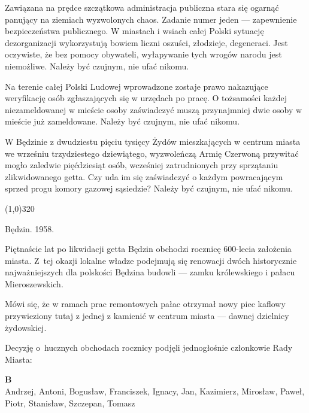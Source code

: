 \documentclass[11pt,a4paper,oneside]{article}
\begin{document}
Zawiązana na prędce szczątkowa administracja publiczna stara się
ogarnąć panujący na ziemiach wyzwolonych chaos. Zadanie numer jeden
--- zapewnienie bezpieczeństwa publicznego. W miastach i wsiach całej
Polski sytuację dezorganizacji wykorzystują bowiem liczni oszuści,
złodzieje, degeneraci. Jest oczywiste, że bez pomocy obywateli,
wyłapywanie tych wrogów narodu jest niemożliwe. Należy być czujnym,
nie ufać nikomu.

Na terenie całej Polski Ludowej wprowadzone zostaje prawo nakazujące
weryfikację osób zgłaszających się w urzędach po pracę. O tożsamości
każdej niezameldowanej w mieście osoby zaświadczyć muszą przynajmniej
dwie osoby w mieście już zameldowane. Należy być czujnym, nie ufać
nikomu. 

W Będzinie z dwudziestu pięciu tysięcy Żydów mieszkających w centrum
miasta we wrześniu trzydziestego dziewiątego, wyzwoleńczą Armię
Czerwoną przywitać mogło zaledwie pięćdziesiąt osób, wcześniej zatrudnionych
przy sprzątaniu zlikwidowanego getta. Czy uda im się zaświadczyć o
każdym powracającym sprzed progu komory gazowej sąsiedzie? Należy być
czujnym, nie ufać nikomu.

\line(1,0){320}

Będzin. 1958.

Piętnaście lat po likwidacji getta Będzin obchodzi rocznicę 600-lecia
założenia miasta. Z~tej okazji lokalne władze podejmują się renowacji
dwóch historycznie najważniejszych dla polskości Będzina budowli --- zamku
królewskiego i pałacu Mieroszewskich.

Mówi się, że w ramach prac remontowych pałac otrzymał nowy piec
kaflowy przywieziony tutaj z jednej z kamienić w centrum miasta ---
dawnej dzielnicy żydowskiej.


Decyzję o~hucznych obchodach rocznicy podjęli
jednogłośnie członkowie Rady Miasta:

\textbf{B}\\
Andrzej, Antoni, Bogusław, Franciszek, Ignacy, Jan, Kazimierz, Mirosław, 
Paweł, Piotr, Stanisław, Szczepan, Tomasz
\end{document}
